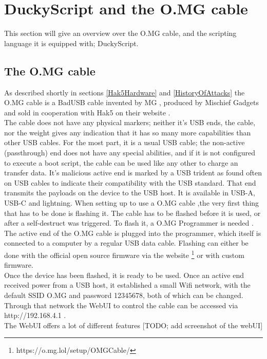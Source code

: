 \section{DuckyScript and the O.MG cable}


This section will give an overview over the O.MG cable, and the scripting language it is equipped with; DuckyScript. 

\subsection{The O.MG cable} \label{theOMGCable}

As described shortly in sections \ref{Hak5Hardware} and \ref{HistoryOfAttacks} the O.MG cable is a BadUSB cable invented by MG \cite{MGCable2019a}, produced by Mischief Gadgets \cite{hak5MischiefGadgets} and sold in cooperation with Hak5 on their website \cite{hak5MischiefGadgets}. \\
The cable does not have any physical markers; neither it's USB ends, the cable, nor the weight gives any indication that it has so many more capabilities than other USB cables. For the most part, it is a usual USB cable; the non-active (passthrough) end does not have any special abilities, and if it is not configured to execute a boot script, the cable can be used like any other to charge an transfer data. It's malicious active end is marked by a USB trident as found often on USB cables to indicate their compatibility with the USB standard. That end transmits the payloads on the device to the USB host. It is available in USB-A, USB-C and lightning. 
When setting up to use a O.MG cable ,the very first thing that has to be done is flashing it. The cable has to be flashed before it is used, or after a self-destruct was triggered. To flash it, a O.MG Programmer is needed \cite{hak5MGCable}. The active end of the O.MG cable is plugged into the programmer, which itself is connected to a computer by a regular USB data cable. Flashing can either be done with the official open source firmware \cite{DuckyScriptSyntaxGuide} via the website \footnote{https://o.mg.lol/setup/OMGCable/} or with custom firmware. \\  
Once the device has been flashed, it is ready to be used. Once an active end received power from a USB host, it established a small Wifi network, with the default SSID O.MG and password 12345678, both of which can be changed. Through that network the WebUI to control the cable can be accessed via http://192.168.4.1 . \\
The WebUI offers a lot of different features [TODO; add screenshot of the webUI]


